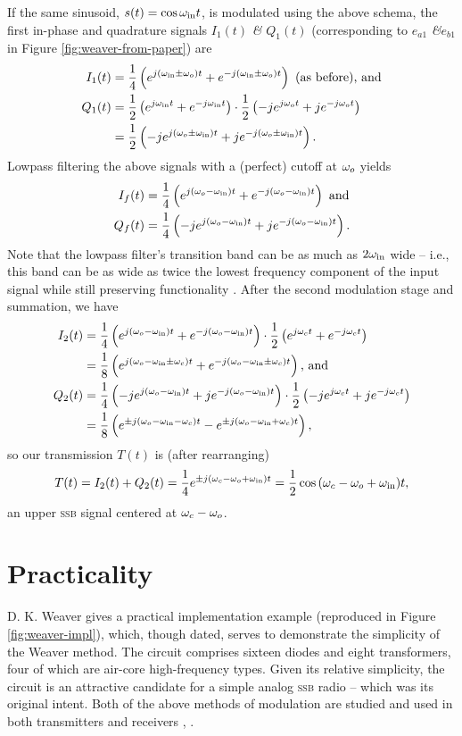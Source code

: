 \documentclass[12pt]{article}
\newcommand{\amp}{\textit{\&}\xspace}
\newcommand{\ssb}{\textsc{ssb}\xspace}
\begin{document}
If the same sinusoid, \(s(t) = \cos \omega_\text{in} t\), is modulated using the
above schema, the first in-phase and quadrature signals \(I_1(t)\) \amp
\(Q_1(t)\) (corresponding to \(e_{a1}\) \amp \(e_{b1}\) in Figure
\ref{fig:weaver-from-paper}) are
\begin{align*}
	I_1(t) &= \frac 1 4 \left(
			e^{j (\omega_\text{in} \pm \omega_o) t} + e^{-j (\omega_\text{in} \pm \omega_o) t}
		\right) \text{ (as before), and} \\
	Q_1(t) &= \frac 1 2 \left(e^{j \omega_\text{in} t} + e^{-j \omega_\text{in} t}\right)
			\cdot \frac 1 2 \left(
				-j e^{j \omega_o t} + j e^{-j \omega_o t}\right
			) \\
		&= \frac 1 2 \left(
			-j e^{j (\omega_o \pm \omega_\text{in}) t} + j e^{-j (\omega_o \pm \omega_\text{in}) t}
		\right).
\end{align*}
Lowpass filtering the above signals with a (perfect) cutoff at \(\omega_o\) yields
\begin{align*}
	I_f(t) &= \frac 1 4 \left(
			e^{j (\omega_o - \omega_\text{in}) t} + e^{-j (\omega_o - \omega_\text{in}) t}
		\right) \text{ and} \\
	Q_f(t) &= \frac 1 4 \left(
			-j e^{j (\omega_o - \omega_\text{in}) t} + j e^{-j (\omega_o - \omega_\text{in}) t}
		\right).
\end{align*}
Note that the lowpass filter's transition band can be as much as \(2 \omega_\text{in}\)
wide -- i.e., this band can be as wide as twice the lowest frequency component
of the input signal while still preserving functionality
\autocite{weaver-rowell}. After the second modulation stage and summation, we
have
\begin{align*}
	I_2(t) &= \frac 1 4 \left(
			e^{j (\omega_o - \omega_\text{in}) t} + e^{-j (\omega_o - \omega_\text{in}) t}
		\right) \cdot \frac 1 2 \left(
			e^{j \omega_c t} + e^{-j \omega_c t}
		\right) \\
		&= \frac 1 8 \left(
			e^{j (\omega_o - \omega_\text{in} \pm \omega_c) t}
			+ e^{-j (\omega_o - \omega_\text{in} \pm \omega_c) t}
		\right) \text{, and} \\
	Q_2(t) &= \frac 1 4 \left(
			-j e^{j (\omega_o - \omega_\text{in}) t} + j e^{-j (\omega_o - \omega_\text{in}) t}
		\right) \cdot \frac 1 2 \left(
			-j e^{j \omega_c t} + j e^{-j \omega_c t}
		\right) \\
		&= \frac 1 8 \left(
			e^{\pm j (\omega_o - \omega_\text{in} - \omega_c) t}
			- e^{\pm j (\omega_o - \omega_\text{in} + \omega_c) t}
		\right),
\end{align*}
so our transmission \(T(t)\) is (after rearranging)
\[
	T(t) = I_2(t) + Q_2(t) = \frac 1 4 e^{\pm j (\omega_c - \omega_o + \omega_\text{in}) t}
		= \frac 1 2 \cos\, (\omega_c - \omega_o + \omega_\text{in}) t,
\]
an upper \ssb signal centered at \(\omega_c - \omega_o\).

\section*{Practicality}
D. K. Weaver gives a practical implementation example (reproduced in Figure
\ref{fig:weaver-impl}), which, though dated, serves to demonstrate the
simplicity of the Weaver method. The circuit comprises sixteen diodes and eight
transformers, four of which are air-core high-frequency types. Given its
relative simplicity, the circuit is an attractive candidate for a simple analog
\ssb radio -- which was its original intent. Both of the above methods of
modulation are studied and used in both transmitters and receivers
\autocite{ssb-thaddeus}, \autocite{rf-microelectronics}.
\end{document}
